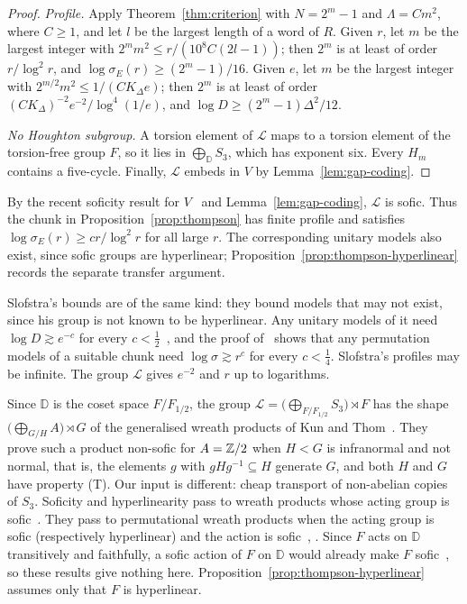 \begin{proof}
\emph{Profile.} Apply Theorem~\ref{thm:criterion} with $N=2^m-1$ and $\Lambda=Cm^2$, where $C\ge1$, and let $l$ be the largest
length of a word of $R$. Given $r$, let $m$ be the largest
integer with $2^mm^2\le r/(10^8C(2l-1))$; then $2^m$ is at least of order $r/\log^2r$, and $\log\sigma_E(r)\ge(2^m-1)/16$. Given
$e$, let $m$ be the largest integer with $2^{m/2}m^2\le1/(CK_\Delta e)$; then $2^m$ is at least of order
$(CK_\Delta)^{-2}e^{-2}/\log^4(1/e)$, and $\log D\ge(2^m-1)\Delta^2/12$.

\emph{No Houghton subgroup.} A torsion element of $\mathcal L$ maps to a torsion element of the torsion-free group $F$, so it lies in
$\bigoplus_{\mathbb D}S_3$, which has exponent six. Every $H_m$ contains a five-cycle. Finally, $\mathcal L$ embeds in $V$ by
Lemma~\ref{lem:gap-coding}.
\end{proof}

By the recent soficity result for $V$~\cite[Theorem~1.1]{CJM2026} and
Lemma~\ref{lem:gap-coding}, $\mathcal L$ is sofic. Thus the chunk in
Proposition~\ref{prop:thompson} has finite profile and satisfies
$\log\sigma_E(r)\ge c r/\log^2 r$ for all large $r$.
The corresponding unitary models also exist, since sofic groups are
hyperlinear; Proposition~\ref{prop:thompson-hyperlinear} records the
separate transfer argument.

Slofstra's bounds are of the same kind: they bound models that may not exist, since his group is not known to be hyperlinear. Any unitary
models of it need $\log D\gtrsim e^{-c}$ for every $c<\frac12$~\cite[Theorem~1.2 and the remark after it]{Slofstra2018}, and the proof
of~\cite[Corollary~1.3]{Slofstra2018} shows that any permutation models of a suitable chunk need $\log\sigma\gtrsim r^c$ for every $c<\frac14$.
Slofstra's profiles may be infinite. The group $\mathcal L$ gives $e^{-2}$ and $r$ up to logarithms.

Since $\mathbb D$ is the coset space $F/F_{1/2}$, the group $\mathcal L=\bigl(\bigoplus_{F/F_{1/2}}S_3\bigr)\rtimes F$ has the shape
$\bigl(\bigoplus_{G/H}A\bigr)\rtimes G$ of the generalised wreath products of Kun and Thom~\cite[Theorem~A]{KunThom2026}. They prove such a
product non-sofic for $A=\mathbb Z/2$ when $H<G$ is infranormal and not normal, that is, the elements $g$ with $gHg^{-1}\subseteq H$ generate $G$, and
both $H$ and $G$ have property (T). Our input is different: cheap transport of non-abelian copies of $S_3$. Soficity and hyperlinearity pass to
wreath products whose acting group is sofic~\cite{HayesSale2018}. They pass to permutational wreath products when the acting group is sofic
(respectively hyperlinear) and the action is sofic~\cite[Theorems~3.6 and~3.8]{GKEP2025}, \cite{AlekseevBradford2026}. Since $F$ acts on
$\mathbb D$ transitively and faithfully, a sofic action of $F$ on $\mathbb D$ would already make $F$ sofic~\cite[Theorem~2.12]{GKEP2025}, so
these results give nothing here. Proposition~\ref{prop:thompson-hyperlinear} assumes only that $F$ is hyperlinear.

